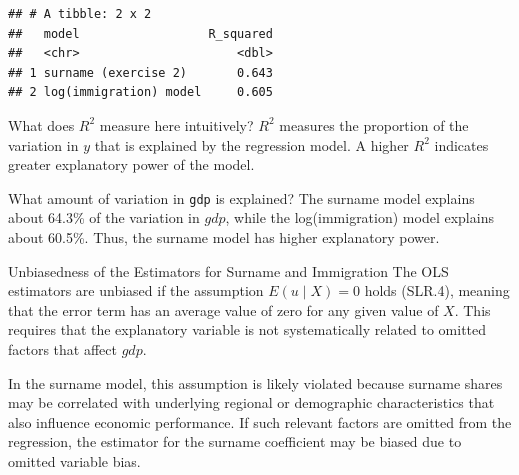 \documentclass[
]{article}
\newenvironment{Shaded}{\begin{snugshade}}{\end{snugshade}}
\newcommand{\AttributeTok}[1]{\textcolor[rgb]{0.13,0.29,0.53}{#1}}
\newcommand{\CommentTok}[1]{\textcolor[rgb]{0.56,0.35,0.01}{\textit{#1}}}
\newcommand{\FloatTok}[1]{\textcolor[rgb]{0.00,0.00,0.81}{#1}}
\newcommand{\FunctionTok}[1]{\textcolor[rgb]{0.13,0.29,0.53}{\textbf{#1}}}
\newcommand{\NormalTok}[1]{#1}
\newcommand{\OtherTok}[1]{\textcolor[rgb]{0.56,0.35,0.01}{#1}}
\newcommand{\SpecialCharTok}[1]{\textcolor[rgb]{0.81,0.36,0.00}{\textbf{#1}}}
\newcommand{\StringTok}[1]{\textcolor[rgb]{0.31,0.60,0.02}{#1}}
\begin{document}
\begin{Shaded}
\end{Shaded}

\begin{verbatim}
## # A tibble: 2 x 2
##   model                  R_squared
##   <chr>                      <dbl>
## 1 surname (exercise 2)       0.643
## 2 log(immigration) model     0.605
\end{verbatim}

What does \(R^2\) measure here intuitively? \(R^2\) measures the
proportion of the variation in \(y\) that is explained by the regression
model. A higher \(R^2\) indicates greater explanatory power of the
model.

What amount of variation in \texttt{gdp} is explained? The surname model
explains about 64.3\% of the variation in \(gdp\), while the
log(immigration) model explains about 60.5\%. Thus, the surname model
has higher explanatory power.

Unbiasedness of the Estimators for Surname and Immigration The OLS
estimators are unbiased if the assumption \(E(u \mid X) = 0\) holds
(SLR.4), meaning that the error term has an average value of zero for
any given value of \(X\). This requires that the explanatory variable is
not systematically related to omitted factors that affect \(gdp\).

In the surname model, this assumption is likely violated because surname
shares may be correlated with underlying regional or demographic
characteristics that also influence economic performance. If such
relevant factors are omitted from the regression, the estimator for the
surname coefficient may be biased due to omitted variable bias.
\end{document}
